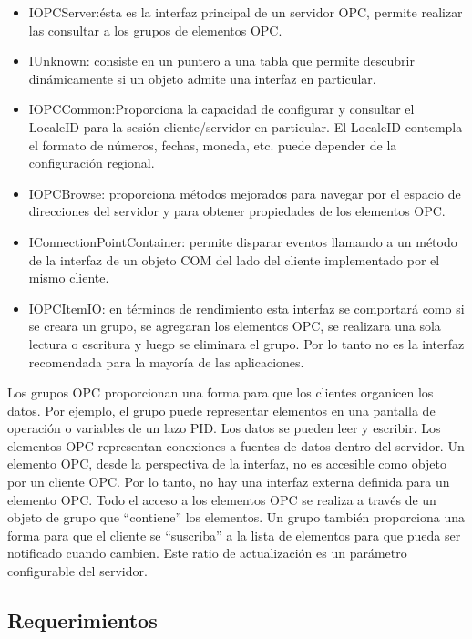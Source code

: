 
\begin{itemize}
\item IOPCServer:ésta es la interfaz principal de un servidor OPC, permite realizar las consultar a los grupos de elementos OPC.
\item IUnknown: consiste en un puntero a una tabla que permite descubrir dinámicamente si un objeto admite una interfaz en particular.
\item IOPCCommon:Proporciona la capacidad de configurar y consultar el LocaleID para la sesión cliente/servidor en particular. El LocaleID contempla el formato de números, fechas, moneda, etc. puede depender de la configuración regional.
\item IOPCBrowse: proporciona métodos mejorados para navegar por el espacio de direcciones del servidor y para
obtener propiedades de los elementos OPC.
\item IConnectionPointContainer: permite disparar eventos llamando a un método de la interfaz de un objeto COM del lado del cliente implementado por el mismo cliente.
\item IOPCItemIO: en términos de rendimiento esta interfaz se comportará como si se creara un grupo, se agregaran los elementos OPC, se realizara una sola lectura o escritura y luego se eliminara el grupo. Por lo tanto no es la interfaz recomendada para la mayoría de las aplicaciones.
\end{itemize}

Los grupos OPC proporcionan una forma para que los clientes organicen los datos. Por ejemplo, el grupo puede representar elementos en una pantalla de operación o variables de un lazo PID. Los datos se pueden leer y escribir. Los elementos OPC representan conexiones a fuentes de datos dentro del servidor. Un elemento OPC, desde la perspectiva de la interfaz, no es accesible como objeto por un cliente OPC. Por lo tanto, no hay una interfaz externa definida para un elemento OPC. Todo el acceso a los elementos OPC se realiza a través de un objeto de grupo que ``contiene'' los elementos. Un grupo también proporciona una forma para que el cliente se ``suscriba'' a la lista de elementos para que pueda ser notificado cuando cambien. Este ratio de actualización es un parámetro configurable del servidor.


\subsection{Requerimientos}

